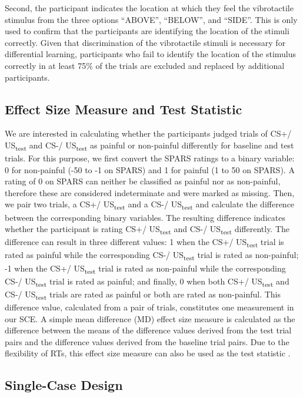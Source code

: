 \documentclass{article}
\begin{document}
Second, the participant indicates the location at which they feel the vibrotactile stimulus from the three options “ABOVE”, “BELOW”, and “SIDE”. This is only used to confirm that the participants are identifying the location of the stimuli correctly. Given that discrimination of the vibrotactile stimuli is necessary for differential learning, participants who fail to identify the location of the stimulus correctly in at least 75\% of the trials are excluded and replaced by additional participants.

\subsection{Effect Size Measure and Test Statistic} 

We are interested in calculating whether the participants judged trials of CS+/ US\textsubscript{test} and CS-/ US\textsubscript{test} as painful or non-painful differently for baseline and test trials. For this purpose, we first convert the SPARS ratings to a binary variable: 0 for non-painful (-50 to -1 on SPARS) and 1 for painful (1 to 50 on SPARS). A rating of 0 on SPARS can neither be classified as painful nor as non-painful, therefore these are considered indeterminate and were marked as missing. Then, we pair two trials, a CS+/ US\textsubscript{test} and a CS-/ US\textsubscript{test} and calculate the difference between the corresponding binary variables. The resulting difference indicates whether the participant is rating CS+/ US\textsubscript{test} and CS-/ US\textsubscript{test} differently. The difference can result in three different values: 1 when the CS+/ US\textsubscript{test} trial is rated as painful while the corresponding CS-/ US\textsubscript{test} trial is rated as non-painful; -1 when the CS+/ US\textsubscript{test} trial is rated as non-painful while the corresponding CS-/ US\textsubscript{test} trial is rated as painful; and finally, 0 when both CS+/ US\textsubscript{test} and CS-/ US\textsubscript{test} trials are rated as painful or both are rated as non-painful. This difference value, calculated from a pair of trials, constitutes one measurement in our SCE. A simple mean difference (MD) effect size measure is calculated as the difference between the means of the difference values derived from the test trial pairs and the difference values derived from the baseline trial pairs. Due to the flexibility of RTs, this effect size measure can also be used as the test statistic \autocite{bib31}. 

\subsection{Single-Case Design }
\end{document}
